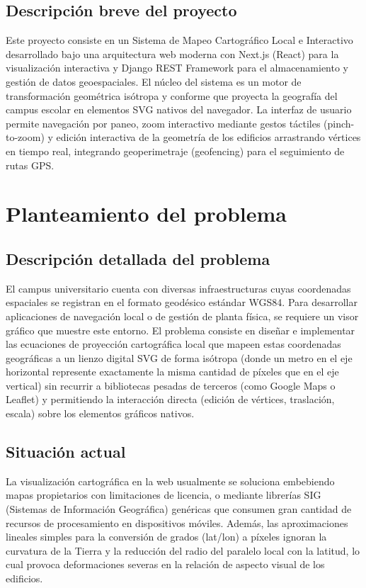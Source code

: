 \documentclass[12pt,a4paper]{article}
\begin{document}
\subsection{Descripción breve del proyecto}
Este proyecto consiste en un Sistema de Mapeo Cartográfico Local e Interactivo desarrollado bajo una arquitectura web moderna con Next.js (React) para la visualización interactiva y Django REST Framework para el almacenamiento y gestión de datos geoespaciales. El núcleo del sistema es un motor de transformación geométrica isótropa y conforme que proyecta la geografía del campus escolar en elementos SVG nativos del navegador. La interfaz de usuario permite navegación por paneo, zoom interactivo mediante gestos táctiles (pinch-to-zoom) y edición interactiva de la geometría de los edificios arrastrando vértices en tiempo real, integrando geoperimetraje (geofencing) para el seguimiento de rutas GPS.

\section{Planteamiento del problema}

\subsection{Descripción detallada del problema}
El campus universitario cuenta con diversas infraestructuras cuyas coordenadas espaciales se registran en el formato geodésico estándar WGS84. Para desarrollar aplicaciones de navegación local o de gestión de planta física, se requiere un visor gráfico que muestre este entorno. El problema consiste en diseñar e implementar las ecuaciones de proyección cartográfica local que mapeen estas coordenadas geográficas a un lienzo digital SVG de forma isótropa (donde un metro en el eje horizontal represente exactamente la misma cantidad de píxeles que en el eje vertical) sin recurrir a bibliotecas pesadas de terceros (como Google Maps o Leaflet) y permitiendo la interacción directa (edición de vértices, traslación, escala) sobre los elementos gráficos nativos.

\subsection{Situación actual}
La visualización cartográfica en la web usualmente se soluciona embebiendo mapas propietarios con limitaciones de licencia, o mediante librerías SIG (Sistemas de Información Geográfica) genéricas que consumen gran cantidad de recursos de procesamiento en dispositivos móviles. Además, las aproximaciones lineales simples para la conversión de grados (lat/lon) a píxeles ignoran la curvatura de la Tierra y la reducción del radio del paralelo local con la latitud, lo cual provoca deformaciones severas en la relación de aspecto visual de los edificios.
\end{document}
